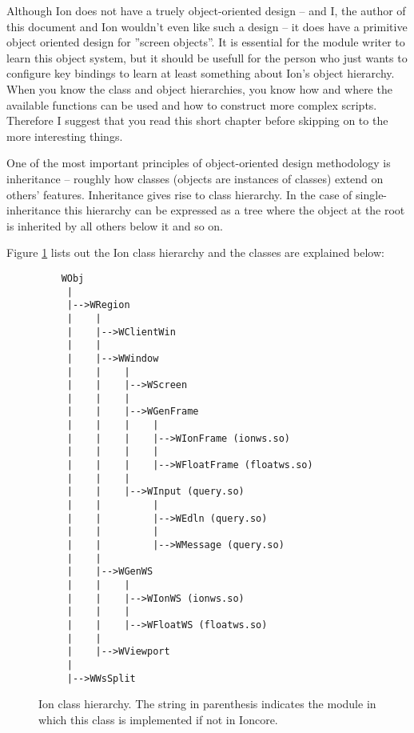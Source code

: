 
\label{chap:prelim}

Although Ion does not have a truely object-oriented design -- and I,
the author of this document and Ion wouldn't even like such a design -- 
it does have a primitive object oriented design for ''screen objects''.
It is essential for the module writer to learn this object system,
but it should be usefull for the person who just wants to configure
key bindings to learn at least something about Ion's object hierarchy.
When you know the class and object hierarchies, you know how and where
the available functions can be used and how to construct more complex
scripts. Therefore I suggest that you read this short chapter before
skipping on to the more interesting things.



One of the most important principles of object-oriented design methodology
is inheritance -- roughly how classes (objects are instances of classes)
extend on others' features. Inheritance gives rise to class hierarchy.
In the case of single-inheritance this hierarchy can be expressed as a
tree where the object at the root is inherited by all others below it
and so on.

Figure \ref{fig:classhierarchy} lists out the Ion class hierarchy and
the classes are explained below:

\begin{figure}
\begin{verbatim}
    WObj
     |
     |-->WRegion
     |    |
     |    |-->WClientWin
     |    |
     |    |-->WWindow
     |    |    |
     |    |    |-->WScreen
     |    |    |
     |    |    |-->WGenFrame
     |    |    |    |
     |    |    |    |-->WIonFrame (ionws.so)
     |    |    |    |
     |    |    |    |-->WFloatFrame (floatws.so)
     |    |    |
     |    |    |-->WInput (query.so)
     |    |         |
     |    |         |-->WEdln (query.so)
     |    |         |
     |    |         |-->WMessage (query.so)
     |    |
     |    |-->WGenWS
     |    |    |
     |    |    |-->WIonWS (ionws.so)
     |    |    |
     |    |    |-->WFloatWS (floatws.so)
     |    |
     |    |-->WViewport
     |
     |-->WWsSplit
\end{verbatim}
\caption{Ion class hierarchy. The string in parenthesis indicates
  the module in which this class is implemented if not in Ioncore.}
\label{fig:classhierarchy}
\end{figure}

